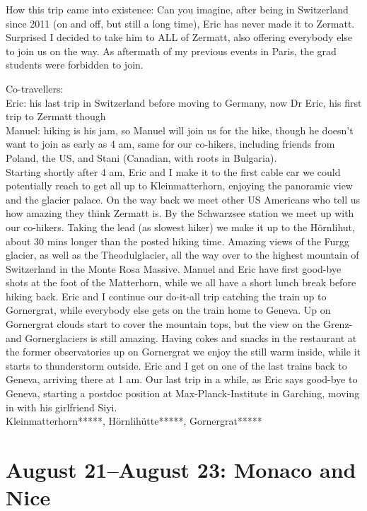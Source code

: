How this trip came into existence: Can you imagine, after being in Switzerland since 2011 (on and off, but still a long time), Eric has never made it to Zermatt. Surprised I decided to take him to ALL of Zermatt, also offering everybody else to join us on the way. As aftermath of my previous events in Paris, the grad students were forbidden to join.

Co-travellers:\\
Eric: his last trip in Switzerland before moving to Germany, now Dr Eric, his first trip to Zermatt though\\

Manuel: hiking is his jam, so Manuel will join us for the hike, though he doesn't want to join as early as 4 am, same for our co-hikers, including friends from Poland, the US, and Stani (Canadian, with roots in Bulgaria).\\

Starting shortly after 4 am, Eric and I make it to the first cable car we could potentially reach to get all up to Kleinmatterhorn, enjoying the panoramic view and the glacier palace. On the way back we meet other US Americans who tell us how amazing they think Zermatt is. By the Schwarzsee station we meet up with our co-hikers. Taking the lead (as slowest hiker) we make it up to the H\"ornlihut, about 30 mins longer than the posted hiking time. Amazing views of the Furgg glacier, as well as the Theodulglacier, all the way over to the highest mountain of Switzerland in the Monte Rosa Massive. Manuel and Eric have first good-bye shots at the foot of the Matterhorn, while we all have a short lunch break before hiking back. Eric and I continue our do-it-all trip catching the train up to Gornergrat, while everybody else gets on the train home to Geneva. Up on Gornergrat clouds start to cover the mountain tops, but the view on the Grenz- and Gornerglaciers is still amazing. Having cokes and snacks in the restaurant at the former observatories up on Gornergrat we enjoy the still warm inside, while it starts to thunderstorm outside. Eric and I get on one of the last trains back to Geneva, arriving there at 1 am. Our last trip in a while, as Eric says good-bye to Geneva, starting a postdoc position at Max-Planck-Institute in Garching, moving in with his girlfriend Siyi.\\

Kleinmatterhorn*****, H\"ornlih\"utte*****, Gornergrat*****

\section{August 21--August 23: Monaco and Nice}
\label{2015:Monaco}

